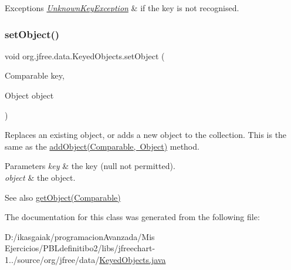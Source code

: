 \begin{DoxyExceptions}{Exceptions}
{\em \mbox{\hyperlink{classorg_1_1jfree_1_1data_1_1_unknown_key_exception}{Unknown\+Key\+Exception}}} & if the key is not recognised. \\
\hline
\end{DoxyExceptions}
\mbox{\label{classorg_1_1jfree_1_1data_1_1_keyed_objects_aeb12f4c31d2ec23d2dda75a114e7813c}} 
\subsubsection{\texorpdfstring{set\+Object()}{setObject()}}
{\footnotesize\ttfamily void org.\+jfree.\+data.\+Keyed\+Objects.\+set\+Object (\begin{DoxyParamCaption}\item[{Comparable}]{key,  }\item[{Object}]{object }\end{DoxyParamCaption})}

Replaces an existing object, or adds a new object to the collection. This is the same as the \mbox{\hyperlink{classorg_1_1jfree_1_1data_1_1_keyed_objects_a6a48961294a54e5a2d1c64489ab52cf6}{add\+Object(\+Comparable, Object)}} method.


\begin{DoxyParams}{Parameters}
{\em key} & the key ({\ttfamily null} not permitted). \\
\hline
{\em object} & the object.\\
\hline
\end{DoxyParams}
\begin{DoxySeeAlso}{See also}
\mbox{\hyperlink{classorg_1_1jfree_1_1data_1_1_keyed_objects_aad4f61f3e7f311960cf0064b8d304155}{get\+Object(\+Comparable)}} 
\end{DoxySeeAlso}


The documentation for this class was generated from the following file\+:\begin{DoxyCompactItemize}
\item 
D\+:/ikasgaiak/programacion\+Avanzada/\+Mis Ejercicios/\+P\+B\+Ldefinitibo2/libs/jfreechart-\/1../source/org/jfree/data/\mbox{\hyperlink{_keyed_objects_8java}{Keyed\+Objects.\+java}}\end{DoxyCompactItemize}

